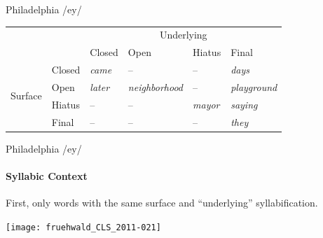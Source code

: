 \documentclass[]{beamer}
\begin{document}
\begin{frame}{Philadelphia /ey/}

\begin{tabular}{llllll}
\toprule
	&&\multicolumn{4}{c}{Underlying}\\
	
								&&Closed & Open & Hiatus & Final\\
	\cmidrule{3-6}
	\multirow{4}{*}{Surface}&Closed&{\it came} & -- & -- & {\it days}\\
						&Open	&{\it later} & {\it neighborhood} & -- & {\it playground}\\
						&Hiatus & -- & -- & {\it mayor} & {\it saying}\\
						&Final & -- & -- & -- & {\it they}\\
	\bottomrule
\end{tabular}


\end{frame}



\begin{frame}{Philadelphia /ey/}
	\framesubtitle{Syllabic Context}
First, only words with the same surface and ``underlying'' syllabification.

\texttt{[image: fruehwald\_CLS\_2011-021]}
	
\end{frame}
\end{document}
